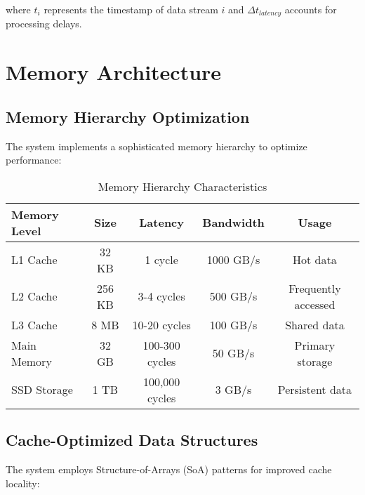 where $t_i$ represents the timestamp of data stream $i$ and $\Delta t_{latency}$ accounts for processing delays.

\section{Memory Architecture}
\label{sec:memory_architecture}

\subsection{Memory Hierarchy Optimization}

The \rus{} system implements a sophisticated memory hierarchy to optimize performance:

\begin{table}[H]
\centering
\caption{Memory Hierarchy Characteristics}
\label{tab:memory_hierarchy}
\begin{tabular}{@{}lcccc@{}}
\toprule
\textbf{Memory Level} & \textbf{Size} & \textbf{Latency} & \textbf{Bandwidth} & \textbf{Usage} \\
\midrule
L1 Cache & 32 KB & 1 cycle & 1000 GB/s & Hot data \\
L2 Cache & 256 KB & 3-4 cycles & 500 GB/s & Frequently accessed \\
L3 Cache & 8 MB & 10-20 cycles & 100 GB/s & Shared data \\
Main Memory & 32 GB & 100-300 cycles & 50 GB/s & Primary storage \\
SSD Storage & 1 TB & 100,000 cycles & 3 GB/s & Persistent data \\
\bottomrule
\end{tabular}
\end{table}

\subsection{Cache-Optimized Data Structures}

The system employs Structure-of-Arrays (SoA) patterns for improved cache locality:

